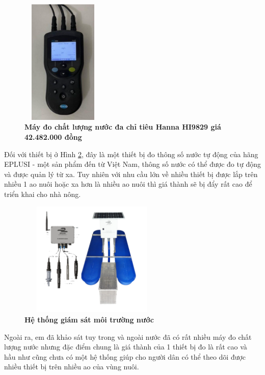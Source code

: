 \documentclass{article} %
\begin{document}
	\begin{figure}[!ht]
		\centering
		\includegraphics[width=4cm,height=6cm]{Images/maydo.png}
		\caption[Máy đo chất lượng nước đa chỉ tiêu Hanna HI9829 giá 42.482.000 đồng \cite{HannaHI9829} ]{\bfseries \fontsize{12pt}{0pt}\selectfont Máy đo chất lượng nước đa chỉ tiêu Hanna HI9829 giá 42.482.000 đồng \cite{HannaHI9829}}
		\label{maydo}
	\end{figure}
	
	Đối với thiết bị ở Hình \ref{giamsat}, đây là một thiết bị đo thông số nước tự động của hãng EPLUSI - một sản phẩm đến từ Việt Nam, thông số nước có thể được đo tự động và được quản lý từ xa. Tuy nhiên với nhu cầu lớn về nhiều thiết bị được lắp trên nhiều 1 ao nuôi hoặc xa hơn là nhiều ao nuôi thì giá thành sẽ bị đẩy rất cao để triển khai cho nhà nông.
	
	\begin{figure}[!ht]
		\centering
		\includegraphics[width=7cm,height=5.5cm]{Images/giamsat.png}
		\caption[Hệ thống giám sát môi trường nước \cite{E-SENSORAQUA} ]{\bfseries \fontsize{12pt}{0pt}\selectfont Hệ thống giám sát môi trường nước \cite{E-SENSORAQUA}}
		\label{giamsat}
	\end{figure}
	
	Ngoài ra, em đã khảo sát tuy trong và ngoài nước đã có rất nhiều máy đo chất lượng nước nhưng đặc điểm chung là giá thành của 1 thiết bị đo là rất cao và hầu như cũng chưa có một hệ thống giúp cho người dân có thể theo dõi được nhiều thiết bị trên nhiều ao của vùng nuôi. 
	
\end{document}
